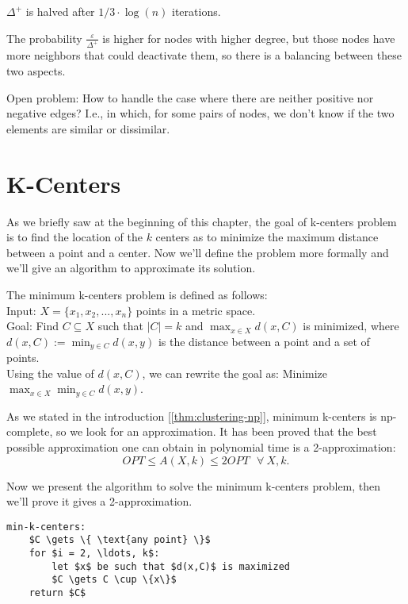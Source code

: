 \begin{thm}
    $\Delta^+$ is halved after $1/3 \cdot \log(n)$ iterations.
\end{thm}

\obs The probability $\frac{\varepsilon}{\Delta^+}$ is higher for nodes with higher degree, but those nodes have more neighbors that could deactivate them, so there is a balancing between these two aspects.

Open problem: How to handle the case where there are neither positive nor negative edges? I.e., in which, for some pairs of nodes, we don't know if the two elements are similar or dissimilar.


\section{K-Centers}\label{sec:k-centers}

As we briefly saw at the beginning of this chapter, the goal of k-centers problem is to find the location of the $k$ centers as to minimize the maximum distance between a point and a center. Now we'll define the problem more formally and we'll give an algorithm to approximate its solution.

\begin{defn}\label{defn:k-centers}
    The minimum k-centers problem is defined as follows:\\
    Input: $X = \{x_1, x_2, ..., x_n\}$ points in a metric space.\\
    Goal: Find $C \subseteq X$ such that $|C| = k$ and $\max_{x \in X} d(x,C)$ is minimized, where $d(x,C) := \min_{y \in C} d(x,y)$ is the distance between a point and a set of points.\\
    Using the value of $d(x,C)$, we can rewrite the goal as: Minimize $\max_{x \in X} \min_{y \in C} d(x, y)$.
\end{defn}

As we stated in the introduction [\ref{thm:clustering-np}], minimum k-centers is np-complete, so we look for an approximation. It has been proved that the best possible approximation one can obtain in polynomial time is a 2-approximation: $$OPT \leq A(X,k) \leq 2 OPT \ \ \ \forall\ X,k.$$

Now we present the algorithm to solve the minimum k-centers problem, then we'll prove it gives a 2-approximation.

\begin{lstlisting}[caption={Minimum k-centers}, label={lst:min-k-centers}]
min-k-centers:
    $C \gets \{ \text{any point} \}$
    for $i = 2, \ldots, k$:
        let $x$ be such that $d(x,C)$ is maximized
        $C \gets C \cup \{x\}$
    return $C$
\end{lstlisting}

